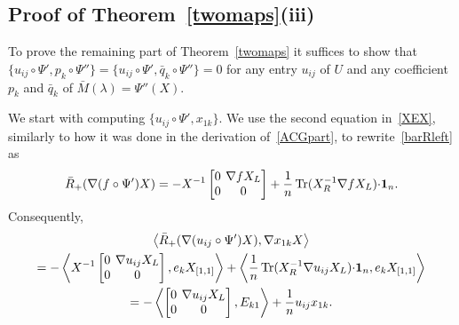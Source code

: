 \documentclass{amsart}
\theoremstyle{definition}
\theoremstyle{remark}
\numberwithin{equation}{section}
\numberwithin{theorem}{section}
\def\nablac{{\nabla}}
\def\nar{\setlength\arraycolsep{2pt}}
\def\one{\mathbf 1}
\def\Tr{\operatorname{Tr}}
\begin{document}
\subsection{Proof of Theorem~\ref{twomaps}(iii)} To prove the remaining part of Theorem~\ref{twomaps} it suffices
to show that $\{u_{ij}\circ\Psi',p_k\circ\Psi''\}=\{u_{ij}\circ\Psi',\bar q_k\circ\Psi''\}=0$ for any entry $u_{ij}$ 
of $U$ and any coefficient $p_k$ and $\bar q_k$ of $\bar M(\lambda)=\Psi''(X)$.

We start with computing $\{u_{ij}\circ\Psi',x_{1k}\}$. We use the second equation in~\eqref{XEX}, similarly to how it was done in the derivation of~\eqref{ACGpart}, to rewrite~\eqref{barRleft} as 
\[
\bar R_+(\nabla (f\circ\Psi')X)=
-\nar X^{-1}\begin{bmatrix} 0 &\nablac f X_L\cr 0&0\end{bmatrix}
 +\frac1n\Tr (X_R^{-1}\nablac f X_L) {\cdot}\one_n.
\]
Consequently,
\begin{multline*}
\left\langle \bar R_+(\nabla (u_{ij}\circ\Psi')X),\nabla x_{1k}X\right\rangle\\=
-\left\langle X^{-1}\nar\begin{bmatrix} 0 &\nablac u_{ij} X_L\cr 0&0\end{bmatrix},e_kX_{[1,1]}\right\rangle
+\left\langle\frac1n\Tr (X_R^{-1}\nablac u_{ij} X_L) {\cdot}\one_n,e_kX_{[1,1]}\right\rangle\\=
-\left\langle \nar\begin{bmatrix} 0 &\nablac u_{ij} X_L\cr 0&0\end{bmatrix},E_{k1}\right\rangle+\frac1n u_{ij}x_{1k}.
\end{multline*}
\end{document}
